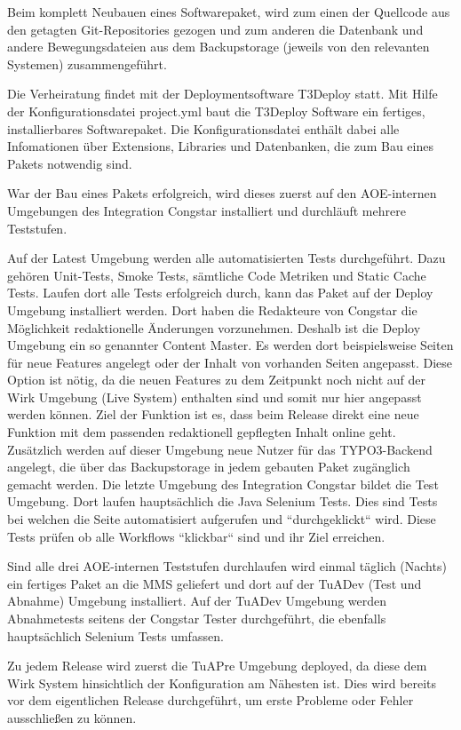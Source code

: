 \documentclass[11pt,a4paper]{article}
\begin{document}
Beim komplett Neubauen eines Softwarepaket, wird zum einen der Quellcode aus den getagten Git-Repositories gezogen und zum anderen die Datenbank und andere Bewegungsdateien aus dem Backupstorage (jeweils von den relevanten Systemen) zusammengeführt.

Die Verheiratung findet mit der Deploymentsoftware T3Deploy statt. Mit Hilfe der Konfigurationsdatei project.yml baut die T3Deploy Software ein fertiges, installierbares Softwarepaket. Die Konfigurationsdatei enthält dabei alle Infomationen über Extensions, Libraries und Datenbanken, die zum Bau eines Pakets notwendig sind.

War der Bau eines Pakets erfolgreich, wird dieses zuerst auf den AOE-internen Umgebungen des Integration Congstar installiert und durchläuft mehrere Teststufen.

Auf der Latest Umgebung werden alle automatisierten Tests durchgeführt. Dazu gehören Unit-Tests, Smoke Tests, sämtliche Code Metriken und Static Cache Tests. Laufen dort alle Tests erfolgreich durch, kann das Paket auf der Deploy Umgebung installiert werden. Dort haben die Redakteure von Congstar die Möglichkeit redaktionelle Änderungen vorzunehmen. Deshalb ist die Deploy Umgebung ein so genannter Content Master. Es werden dort beispielsweise Seiten für neue Features angelegt oder der Inhalt von vorhanden Seiten angepasst. Diese Option ist nötig, da die neuen Features zu dem Zeitpunkt noch nicht auf der Wirk Umgebung (Live System) enthalten sind und somit nur hier angepasst werden können. Ziel der Funktion ist es, dass beim Release direkt eine neue Funktion mit dem passenden redaktionell gepflegten Inhalt online geht. Zusätzlich werden auf dieser Umgebung neue Nutzer für das TYPO3-Backend angelegt, die über das Backupstorage in jedem gebauten Paket zugänglich gemacht werden. Die letzte Umgebung des Integration Congstar bildet die Test Umgebung. Dort laufen hauptsächlich die Java Selenium Tests. Dies sind Tests bei welchen die Seite automatisiert aufgerufen und “durchgeklickt“ wird. Diese Tests prüfen ob alle Workflows “klickbar“ sind und ihr Ziel erreichen.

Sind alle drei AOE-internen Teststufen durchlaufen wird einmal täglich (Nachts) ein fertiges Paket an die MMS geliefert und dort auf der TuADev (Test und Abnahme) Umgebung installiert. Auf der TuADev Umgebung werden Abnahmetests seitens der Congstar Tester durchgeführt, die ebenfalls hauptsächlich Selenium Tests umfassen.

Zu jedem Release wird zuerst die TuAPre Umgebung deployed, da diese dem Wirk System hinsichtlich der Konfiguration am Nähesten ist. Dies wird bereits vor dem eigentlichen Release durchgeführt, um erste Probleme oder Fehler ausschließen zu können.
\end{document}
